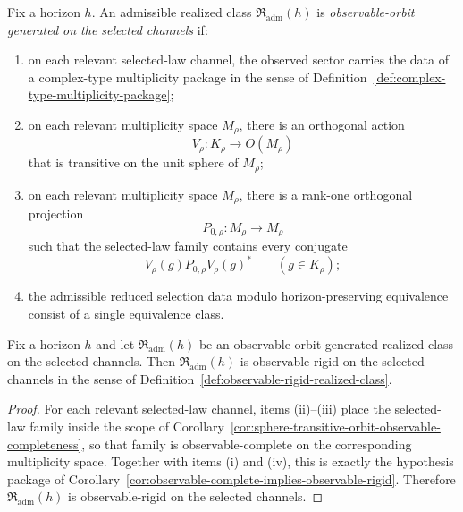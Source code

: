 \begin{definition}
\label{def:observable-orbit-generated-realized-class}
Fix a horizon $h$. An admissible realized class
$\mathfrak R_{\mathrm{adm}}(h)$ is \emph{observable-orbit generated on the
selected channels} if:
\begin{enumerate}[label=(\roman*), leftmargin=2em, itemsep=0.2em]
\item on each relevant selected-law channel, the observed sector carries the
      data of a complex-type multiplicity package in the sense of
      Definition~\ref{def:complex-type-multiplicity-package};
\item on each relevant multiplicity space $M_{\rho}$, there is an orthogonal
      action
      \[
      V_{\rho}:K_{\rho}\to O(M_{\rho})
      \]
      that is transitive on the unit sphere of $M_{\rho}$;
\item on each relevant multiplicity space $M_{\rho}$, there is a rank-one
      orthogonal projection
      \[
      P_{0,\rho}:M_{\rho}\to M_{\rho}
      \]
      such that the selected-law family contains every conjugate
      \[
      V_{\rho}(g)P_{0,\rho}V_{\rho}(g)^*
      \qquad(g\in K_{\rho});
      \]
\item the admissible reduced selection data modulo horizon-preserving
      equivalence consist of a single equivalence class.
\end{enumerate}
\end{definition}

\begin{corollary}
\label{cor:observable-orbit-generated-implies-observable-rigid}
Fix a horizon $h$ and let $\mathfrak R_{\mathrm{adm}}(h)$ be an
observable-orbit generated realized class on the selected channels. Then
$\mathfrak R_{\mathrm{adm}}(h)$ is observable-rigid on the selected channels in
the sense of Definition~\ref{def:observable-rigid-realized-class}.
\end{corollary}

\begin{proof}
For each relevant selected-law channel, items (ii)--(iii) place the
selected-law family inside the scope of
Corollary~\ref{cor:sphere-transitive-orbit-observable-completeness}, so that
family is observable-complete on the corresponding multiplicity space.
Together with items (i) and (iv), this is exactly the hypothesis package of
Corollary~\ref{cor:observable-complete-implies-observable-rigid}. Therefore
$\mathfrak R_{\mathrm{adm}}(h)$ is observable-rigid on the selected channels.
\end{proof}

